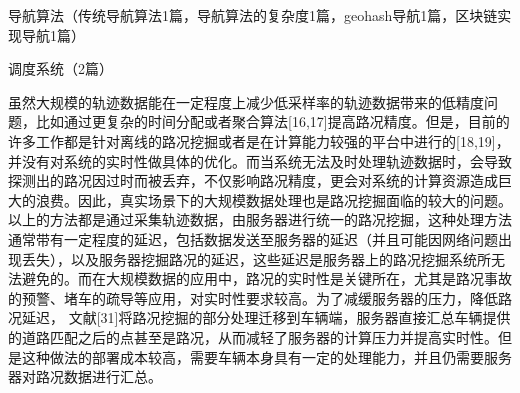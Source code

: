 导航算法（传统导航算法1篇，导航算法的复杂度1篇，geohash导航1篇，区块链实现导航1篇）



调度系统（2篇）










虽然大规模的轨迹数据能在一定程度上减少低采样率的轨迹数据带来的低精度问题，比如通过更复杂的时间分配或者聚合算法[16,17]提高路况精度。但是，目前的许多工作都是针对离线的路况挖掘或者是在计算能力较强的平台中进行的[18,19]，并没有对系统的实时性做具体的优化。而当系统无法及时处理轨迹数据时，会导致探测出的路况因过时而被丢弃，不仅影响路况精度，更会对系统的计算资源造成巨大的浪费。因此，真实场景下的大规模数据处理也是路况挖掘面临的较大的问题。
以上的方法都是通过采集轨迹数据，由服务器进行统一的路况挖掘，这种处理方法通常带有一定程度的延迟，包括数据发送至服务器的延迟（并且可能因网络问题出现丢失），以及服务器挖掘路况的延迟，这些延迟是服务器上的路况挖掘系统所无法避免的。而在大规模数据的应用中，路况的实时性是关键所在，尤其是路况事故的预警、堵车的疏导等应用，对实时性要求较高。为了减缓服务器的压力，降低路况延迟，
文献[31]将路况挖掘的部分处理迁移到车辆端，服务器直接汇总车辆提供的道路匹配之后的点甚至是路况，从而减轻了服务器的计算压力并提高实时性。但是这种做法的部署成本较高，需要车辆本身具有一定的处理能力，并且仍需要服务器对路况数据进行汇总。

